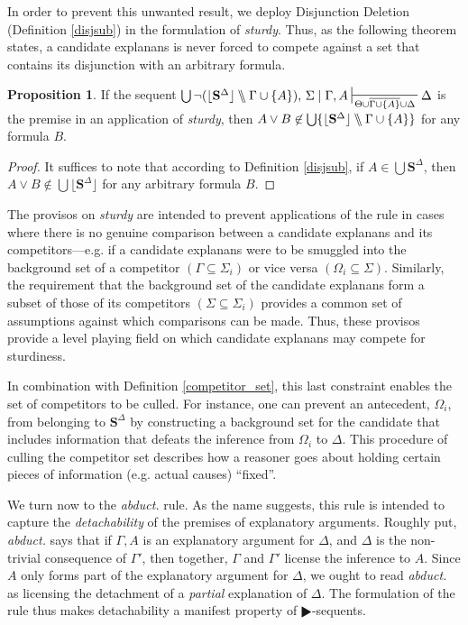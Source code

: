 \documentclass{article}
\theoremstyle{definition}
\theoremstyle{definition}
\theoremstyle{definition}
\theoremstyle{definition}
\theoremstyle{remark}
\theoremstyle{definition}
\newtheorem{proposition}{Proposition}
\theoremstyle{definition}
\begin{document}
In order to prevent this unwanted result, we deploy Disjunction Deletion (Definition \ref{disjsub}) in  the formulation of \textit{sturdy}. Thus, as the following theorem states, a candidate explanans is never forced to compete against a set that contains its disjunction with an arbitrary formula.

\begin{proposition}\label{disjmin2}
	If the sequent $\bigcup\neg(\lfloor\mathbf{S}^\Delta\rfloor \bbslash\Gamma\cup\{A\}),\,\Sigma \mid\Gamma, A \sststile{\Theta\cup \overline{\Gamma\cup\{A\}} \cup\Delta}{}\Delta$ is the premise in an application of \textit{sturdy}, then $ A \vee B \not\in \bigcup \{\lfloor\mathbf{S}^\Delta\rfloor \bbslash\Gamma\cup\{A\}\} $ for any formula $ B $.
	
	\begin{proof}
		It suffices to note that according to Definition \ref{disjsub}, if $ A \in \bigcup\mathbf{S}^\Delta $, then $ A \vee B \not\in \bigcup\lfloor\mathbf{S}^\Delta\rfloor  $ for any arbitrary formula $ B $.
		
	\end{proof}
	
\end{proposition}

The provisos on \textit{sturdy} are intended to prevent applications of the rule in cases where there is no genuine comparison between a candidate explanans and its competitors---e.g. if a candidate explanans were to be smuggled into the background set of a competitor $(\Gamma \subseteq \Sigma_i)$ or vice versa $(\Omega_i \subseteq \Sigma)$. Similarly, the requirement that the background set of the candidate explanans form a subset of those of its competitors $(\Sigma\subseteq \Sigma_i)$ provides a common set of assumptions against which comparisons can be made.  Thus, these provisos provide a level playing field on which candidate explanans may compete for sturdiness.

In combination with Definition \ref{competitor_set}, this last constraint enables the set of competitors to be culled. For instance, one can prevent an antecedent, $ \Omega_i $, from belonging to $ \mathbf{S}^\Delta $ by constructing a background set for the candidate that includes information that defeats the inference from $ \Omega_i $ to $ \Delta $. This procedure of culling the competitor set describes how a reasoner goes about holding certain pieces of information (e.g. actual causes) ``fixed''.


We turn now to the \textit{abduct.} rule. As the name suggests, this rule is intended to capture the \textit{detachability} of the premises of explanatory arguments. Roughly put, \textit{abduct.} says that if $ \Gamma, A $ is an explanatory argument for $ \Delta $, and $ \Delta $ is the non-trivial consequence of $ \Gamma' $, then together, $ \Gamma $ and $ \Gamma' $ license the inference to $ A $. Since $ A $ only forms part of the explanatory argument for $ \Delta $, we ought to read \textit{abduct.} as licensing the detachment of a \textit{partial} explanation of $ \Delta $. The formulation of the rule thus makes detachability a manifest property of $ \RHD $-sequents. 
\end{document}
